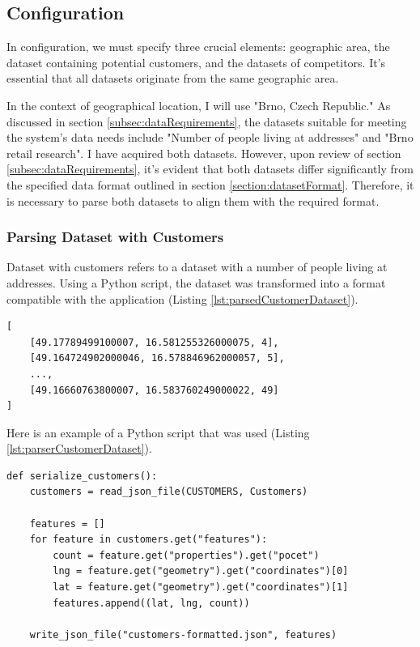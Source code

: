 \subsection{Configuration}

In configuration, we must specify three crucial elements: geographic area, the dataset containing potential customers, and the datasets of competitors. It's essential that all datasets originate from the same geographic area.

In the context of geographical location, I will use "Brno, Czech Republic." As discussed in section \ref{subsec:dataRequirements}, the datasets suitable for meeting the system's data needs include "Number of people living at addresses" and "Brno retail research". I have acquired both datasets. However, upon review of section \ref{subsec:dataRequirements}, it's evident that both datasets differ significantly from the specified data format outlined in section \ref{section:datasetFormat}. Therefore, it is necessary to parse both datasets to align them with the required format.

\subsubsection{Parsing Dataset with Customers}
Dataset with customers refers to a dataset with a number of people living at addresses. Using a Python script, the dataset was transformed into a format compatible with the application (Listing \ref{lst:parsedCustomerDataset}).

\begin{lstlisting}[caption={Result of a parsed dataset},label={lst:parsedCustomerDataset}]
[
    [49.17789499100007, 16.581255326000075, 4], 
    [49.164724902000046, 16.578846962000057, 5], 
    ...,
    [49.16660763800007, 16.583760249000022, 49]
]
\end{lstlisting}

Here is an example of a Python script that was used (Listing \ref{lst:parserCustomerDataset}).

\begin{lstlisting}[caption={Parser written in python to parse the dataset.},label={lst:parserCustomerDataset}]
def serialize_customers():
    customers = read_json_file(CUSTOMERS, Customers)
    
    features = []
    for feature in customers.get("features"):
        count = feature.get("properties").get("pocet")
        lng = feature.get("geometry").get("coordinates")[0]
        lat = feature.get("geometry").get("coordinates")[1]
        features.append((lat, lng, count))
        
    write_json_file("customers-formatted.json", features)
\end{lstlisting}

